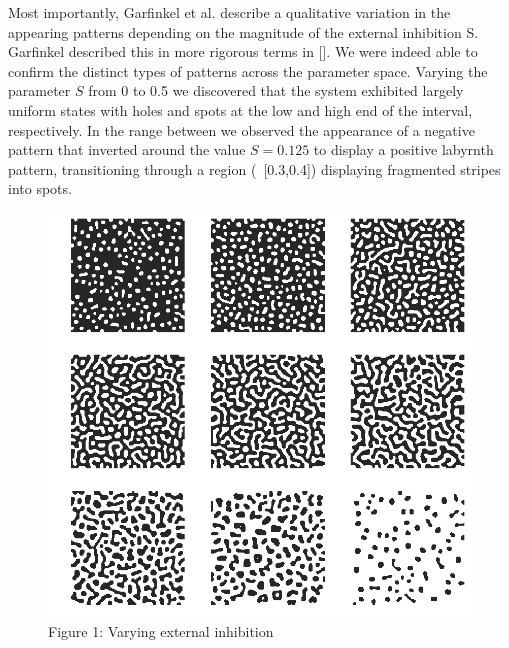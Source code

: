\documentclass[12pt]{article}
\begin{document}
 Most importantly, Garfinkel et al. describe a qualitative variation in the appearing patterns depending on the magnitude of the external inhibition S. Garfinkel described this in more rigorous terms in []. We were indeed able to confirm the distinct types of patterns across the parameter space. Varying the parameter $S$ from 0 to 0.5 we discovered that the system exhibited largely uniform states with holes and spots at the low and high end of the interval, respectively. In the range between we observed the appearance of a negative pattern that inverted around the value $S=0.125$ to display a positive labyrnth pattern, transitioning through a region (~[0.3,0.4]) displaying fragmented stripes into spots.
 
 \begin{figure}
 	\includegraphics[width=\linewidth]{inhibition.png}
 	\caption{Figure 1: Varying external inhibition}
 	\label{fig:s}
 \end{figure}
\end{document}
